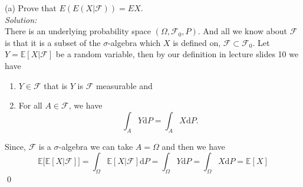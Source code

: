 \documentclass[10pt]{amsart}
\newcommand{\D}{\mathrm{d}}
\begin{document}
 (a) Prove that $E(E(X|\mathcal{F}))=EX$. \\
\textit{Solution:} \\
There is an underlying probability space $(\Omega, \mathcal F_0, P)$.
And all we know about $\mathcal F$ is that it is a subset of the $\sigma$-algebra which $X$ is defined on, $\mathcal F \subset \mathcal F_0$.
Let $Y = \mathbb E[ X | \mathcal F ]$ be a random variable, then by our definition in lecture slides 10 we have
\begin{enumerate}
\item $Y \in \mathcal F$ that is $Y$ is $\mathcal F$ measurable and
\item For all $A \in \mathcal F$, we have
$$\int_{A} Y \D P = \int_{A} X \D P.$$
\end{enumerate}
Since, $\mathcal F$ is a $\sigma$-algebra we can take $A = \Omega$ and then we have
$$
\mathbb E \big[ \mathbb E [X | \mathcal F]\big]
	= \int_\Omega \mathbb E [X | \mathcal F] \D P
	= \int_\Omega Y \D P
	= \int_\Omega X \D P
	= \mathbb E [X]
$$
\qed \\
\end{document}
